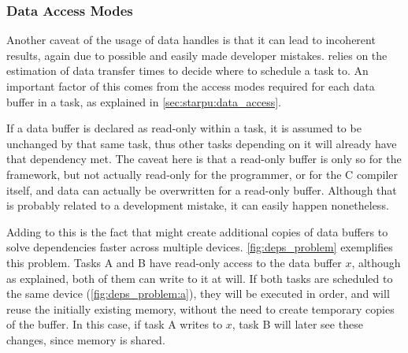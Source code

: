\documentclass[main.tex]{subfiles}
\begin{document}
\subsubsection{Data Access Modes}

Another caveat of the usage of data handles is that it can lead to incoherent results, again due to possible and easily made developer mistakes. \starpu relies on the estimation of data transfer times to decide where to schedule a task to. An important factor of this comes from the access modes required for each data buffer in a task, as explained in \cref{sec:starpu:data_access}.

If a data buffer is declared as read-only within a task, it is assumed to be unchanged by that same task, thus other tasks depending on it will already have that dependency met.
The caveat here is that a read-only buffer is only so for the framework, but not actually read-only for the programmer, or for the C compiler itself, and data can actually be overwritten for a read-only buffer. Although that is probably related to a development mistake, it can easily happen nonetheless.

Adding to this is the fact that \starpu might create additional copies of data buffers to solve dependencies faster across multiple devices. \cref{fig:deps_problem} exemplifies this problem. Tasks A and B have read-only access to the data buffer $x$, although as explained, both of them can write to it at will. If both tasks are scheduled to the same device (\cref{fig:deps_problem:a}), they will be executed in order, and \starpu will reuse the initially existing memory, without the need to create temporary copies of the buffer. In this case, if task A writes to $x$, task B will later see these changes, since memory is shared.
\end{document}
